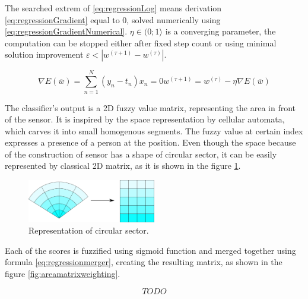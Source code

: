 The searched extrem of \ref{eq:regressionLog} means derivation \ref{eq:regressionGradient}
equal to $0$, solved numerically using \ref{eq:regressionGradientNumerical}.
$\eta \in (0;1\rangle$ is a converging parameter, the computation can be stopped either after
fixed step count or using minimal solution improvement $\varepsilon < | w^{(\tau + 1)} - w^{(\tau)} |$.

\begin{subequations}
\begin{equation}
\nabla E(\overline{w}) = \sum_{n=1}^N (y_n - t_n)x_n = 0
\label{eq:regressionGradient}
\end{equation}
\begin{equation}
w^{(\tau + 1)} = w^{(\tau)} - \eta \nabla E(\overline{w})
\label{eq:regressionGradientNumerical}
\end{equation}
\end{subequations}

The classifier's output is a 2D fuzzy value matrix, representing the area in front of the sensor.
It is inspired by the space representation by cellular automata, which carves it into small
homogenous segments. The fuzzy value at certain index expresses a presence of a person
at the position. Even though the space because of the construction of sensor has a shape of
circular sector, it can be easily represented by classical 2D matrix, as it is shown in the figure \ref{fig:circularsector}.

\begin{figure}[h!]
\begin{center}
\includegraphics[width=0.5\textwidth]{img/circularsector_transformation.png}
\caption{Representation of circular sector.\label{fig:circularsector}}
\end{center}
\end{figure}

Each of the scores is fuzzified using sigmoid function and merged together using formula \ref{eq:regressionmerger},
creating the resulting matrix, as shown in the figure \ref{fig:areamatrixweighting}.

\begin{equation}
TODO
\label{eq:regressionmerger}
\end{equation}



